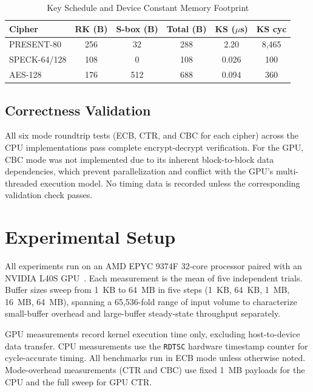 \documentclass[conference]{IEEEtran}
\begin{document}
\begin{table}[t]
\caption{Key Schedule and Device Constant Memory Footprint}
\label{tab:ks}
\begin{center}
\begin{tabular}{|l|c|c|c|c|c|}
\hline
\textbf{Cipher} & \textbf{RK (B)} & \textbf{S-box (B)} & \textbf{Total (B)} & \textbf{KS ($\mu$s)} & \textbf{KS cyc} \\
\hline
PRESENT-80    & 256 & 32  & 288 & 2.20  & 8,465 \\
SPECK-64/128  & 108 & 0   & 108 & 0.026 & 100   \\
AES-128       & 176 & 512 & 688 & 0.094 & 360   \\
\hline
\end{tabular}
\end{center}
\end{table}

\subsection{Correctness Validation}

All six mode roundtrip tests (ECB, CTR, and CBC for each cipher) across the CPU implementations
pass complete encrypt-decrypt verification. For the GPU, CBC mode was not implemented due to its
inherent block-to-block data dependencies, which prevent parallelization and conflict with the GPU's
multi-threaded execution model. No timing data is recorded unless the corresponding validation check
passes.

\section{Experimental Setup}

All experiments run on an AMD EPYC 9374F 32-core processor paired with an NVIDIA L40S GPU~\cite{l40s}.
Each measurement is the mean of five independent trials. Buffer sizes sweep from 1~KB to 64~MB in
five steps (1~KB, 64~KB, 1~MB, 16~MB, 64~MB), spanning a 65,536-fold range of input volume to
characterize small-buffer overhead and large-buffer steady-state throughput separately.

GPU measurements record kernel execution time only, excluding host-to-device data transfer.
CPU measurements use the \texttt{RDTSC} hardware timestamp counter for cycle-accurate timing.
All benchmarks run in ECB mode unless otherwise noted. Mode-overhead measurements (CTR and CBC)
use fixed 1~MB payloads for the CPU and the full sweep for GPU CTR.
\end{document}
